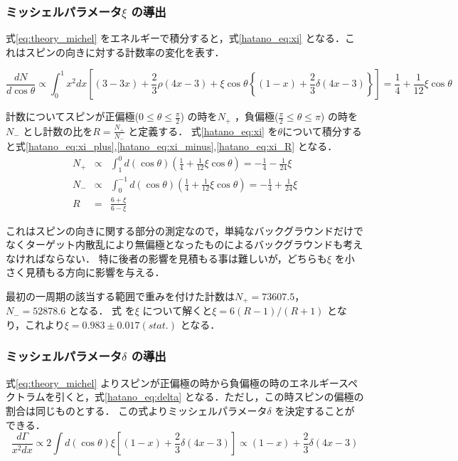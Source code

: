\subsubsection{ミッシェルパラメータ$\xi$ の導出}
式\eqref{eq:theory_michel} をエネルギーで積分すると，式\eqref{hatano_eq:xi} となる．これはスピンの向きに対する計数率の変化を表す．

\begin{equation}
  \frac{dN}{d\cos\theta} \propto \int^1_0 x^2dx\left[ (3-3x) + \frac{2}{3}\rho(4x-3) + \xi\cos\theta\left\{ (1-x) + \frac{2}{3}\delta(4x-3) \right\}\right] = \frac{1}{4} + \frac{1}{12}\xi\cos\theta
  \label{hatano_eq:xi}
\end{equation}

計数についてスピンが正偏極($0\leq\theta\leq\frac{\pi}{2}$) の時を$N_+$ ，負偏極($\frac{\pi}{2}\leq\theta\leq\pi$) の時を$N_-$ とし計数の比を$R=\frac{N_+}{N_-}$ と定義する．
式\eqref{hatano_eq:xi} を$\theta$について積分すると式\eqref{hatano_eq:xi_plus},\eqref{hatano_eq:xi_minus},\eqref{hatano_eq:xi_R} となる．
\begin{eqnarray}
  N_+ & \propto & \int^0_1 d(\cos\theta) \left(\frac{1}{4} + \frac{1}{12}\xi\cos\theta\right)=-\frac{1}{4}-\frac{1}{24}\xi \label{hatano_eq:xi_plus} \\
  N_- & \propto & \int^{-1}_0 d(\cos\theta) \left(\frac{1}{4} + \frac{1}{12}\xi\cos\theta\right)=-\frac{1}{4}+\frac{1}{24}\xi \label{hatano_eq:xi_minus} \\
  R  & = & \frac{6+\xi}{6-\xi} \label{hatano_eq:xi_R}
\end{eqnarray}

これはスピンの向きに関する部分の測定なので，単純なバックグラウンドだけでなくターゲット内散乱により無偏極となったものによるバックグラウンドも考えなければならない．
特に後者の影響を見積もる事は難しいが，どちらも$\xi$ を小さく見積もる方向に影響を与える．

最初の一周期の該当する範囲で重みを付けた計数は$N_+=73607.5$，$N_-=52878.6$ となる．
式\label{hatano_eq:xi_ratio} を$\xi$ について解くと$\xi=6(R-1) / (R+1)$ となり，これより$\xi=0.983\pm0.017 (stat.)$ となる．

\subsubsection{ミッシェルパラメータ$\delta$ の導出}
式\eqref{eq:theory_michel} よりスピンが正偏極の時から負偏極の時のエネルギースペクトラムを引くと，式\eqref{hatano_eq:delta} となる．ただし，この時スピンの偏極の割合は同じものとする．
この式よりミッシェルパラメータ$\delta$ を決定することができる．
\begin{equation}
  \frac{d\Gamma}{x^2dx} \propto 2 \int d(\cos\theta) \xi \left[ (1-x) + \frac{2}{3}\delta(4x-3) \right] \propto (1-x) + \frac{2}{3}\delta(4x-3)
  \label{hatano_eq:delta}
\end{equation}


